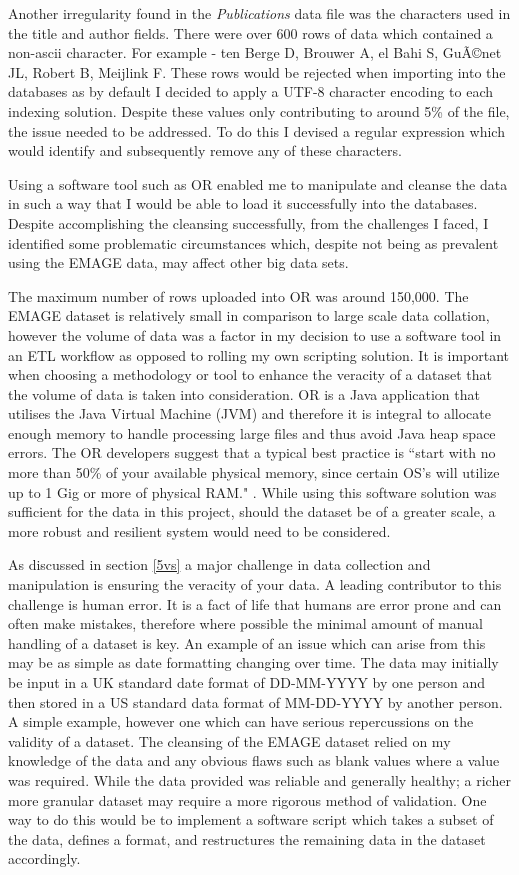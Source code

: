 Another irregularity found in the \textit{Publications} data file was the characters used in the title and author fields. There were over 600 rows of data which contained a non-ascii character. For example - ten Berge D, Brouwer A, el Bahi S, GuÃ©net JL, Robert B, Meijlink F. These rows would be rejected when importing into the databases as by default I decided to apply a UTF-8 character encoding to each indexing solution. Despite these values only contributing to around 5\% of the file, the issue needed to be addressed. To do this I devised a regular expression which would identify and subsequently remove any of these characters.

Using a software tool such as OR enabled me to manipulate and cleanse the data in such a way that I would be able to load it successfully into the databases. Despite accomplishing the cleansing successfully, from the challenges I faced, I identified some problematic circumstances which, despite not being as prevalent using the EMAGE data, may affect other big data sets.

The maximum number of rows uploaded into OR was around 150,000. The EMAGE dataset is relatively small in comparison to large scale data collation, however the volume of data was a factor in my decision to use a software tool in an ETL workflow as opposed to rolling my own scripting solution. It is important when choosing a methodology or tool to enhance the veracity of a dataset that the volume of data is taken into consideration. OR is a Java application that utilises the Java Virtual Machine (JVM) and therefore it is integral to allocate enough memory to handle processing large files and thus avoid Java heap space errors. The OR developers suggest that a typical best practice is ``start with no more than 50\% of your available physical memory, since certain OS's will utilize up to 1 Gig or more of physical RAM." \cite{googref}. While using this software solution was sufficient for the data in this project, should the dataset be of a greater scale, a more robust and resilient system would need to be considered.

As discussed in section \ref{5vs} a major challenge in data collection and manipulation is ensuring the veracity of your data. A leading contributor to this challenge is human error. It is a fact of life that humans are error prone and can often make mistakes, therefore where possible the minimal amount of manual handling of a dataset is key. An example of an issue which can arise from this may be as simple as date formatting changing over time. The data may initially be input in a UK standard date format of DD-MM-YYYY by one person and then stored in a US standard data format of MM-DD-YYYY by another person. A simple example, however one which can have serious repercussions on the validity of a dataset. The cleansing of the EMAGE dataset relied on my knowledge of the data and any obvious flaws such as blank values where a value was required. While the data provided was reliable and generally healthy; a richer more granular dataset may require a more rigorous method of validation. One way to do this would be to implement a software script which takes a subset of the data, defines a format, and restructures the remaining data in the dataset accordingly.

